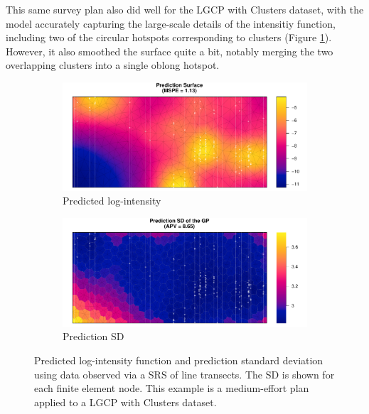 \documentclass[review]{elsarticle}
\begin{document}
This same survey plan also did well for the LGCP with Clusters dataset, with
the model accurately capturing the large-scale details of the intensitiy
function, including two of the circular hotspots corresponding to clusters
(Figure \ref{lambdasrs000187clust}). However, it also smoothed the surface
quite a bit, notably merging the two overlapping clusters into a single oblong
hotspot.

\begin{figure}

\begin{subfigure}{5in}
\includegraphics[width=5in]{../graphics/lambda-SRS000187-Cluster000004.pdf}
\caption{Predicted log-intensity}
\label{lambdasrs000187clust}
\end{subfigure}

\begin{subfigure}{5in}
\includegraphics[width=5in]{../graphics/lambdaSD-SRS000187-Cluster000004.pdf}
\caption{Prediction SD}
\label{sdsrs000187clust}
\end{subfigure}

\caption{Predicted log-intensity function and prediction standard deviation
using data observed via a SRS of line transects. The SD is shown for each
finite element node. This example is a medium-effort plan applied to a
LGCP with Clusters dataset.}
\label{srs000187clust}
\end{figure}
\end{document}
